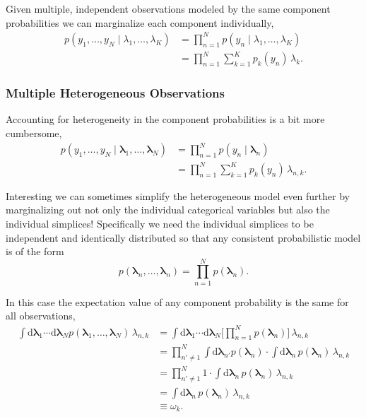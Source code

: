 \documentclass[
  letterpaper,
  DIV=11,
  numbers=noendperiod]{scrartcl}
\begin{document}
Given multiple, independent observations modeled by the same component
probabilities we can marginalize each component individually,
\begin{align*}
p(y_{1}, \ldots, y_{N} \mid \lambda_{1}, \ldots, \lambda_{K})
&=
\prod_{n = 1}^{N} p(y_{n} \mid \lambda_{1}, \ldots, \lambda_{K})
\\
&=
\prod_{n = 1}^{N} \sum_{k = 1}^{K} p_{k}(y_{n}) \, \lambda_{k}.
\end{align*}

\subsubsection{Multiple Heterogeneous
Observations}\label{multiple-heterogeneous-observations}

Accounting for heterogeneity in the component probabilities is a bit
more cumbersome, \begin{align*}
p(y_{1}, \ldots, y_{N} \mid
  \boldsymbol{\lambda}_{1}, \ldots, \boldsymbol{\lambda}_{N})
&=
\prod_{n = 1}^{N} p(y_{n} \mid \boldsymbol{\lambda}_{n})
\\
&=
\prod_{n = 1}^{N} \sum_{k = 1}^{K} p_{k}(y_{n}) \, \lambda_{n, k}.
\end{align*}

Interesting we can sometimes simplify the heterogeneous model even
further by marginalizing out not only the individual categorical
variables but also the individual simplices! Specifically we need the
individual simplices to be independent and identically distributed so
that any consistent probabilistic model is of the form \[
p(\boldsymbol{\lambda}_{n}, \ldots, \boldsymbol{\lambda}_{n})
=
\prod_{n = 1}^{N} p(\boldsymbol{\lambda}_{n}).
\]

In this case the expectation value of any component probability is the
same for all observations, \begin{align*}
\int \mathrm{d} \boldsymbol{\lambda}_{1} \cdots
     \mathrm{d} \boldsymbol{\lambda}_{N}
p(\boldsymbol{\lambda}_{1}, \ldots, \boldsymbol{\lambda}_{N}) \,
\lambda_{n, k}
&=
\int \mathrm{d} \boldsymbol{\lambda}_{1} \cdots
     \mathrm{d} \boldsymbol{\lambda}_{N}
\bigg[ \prod_{n = 1}^{N} p(\boldsymbol{\lambda}_{n}) \bigg] \,
\lambda_{n, k}
\\
&=
\prod_{n' \ne 1}^{N}
\int \mathrm{d} \boldsymbol{\lambda}_{n'}
p(\boldsymbol{\lambda}_{n})
\cdot
\int \mathrm{d} \boldsymbol{\lambda}_{n} \,
p(\boldsymbol{\lambda}_{n}) \, \lambda_{n, k}
\\
&=
\prod_{n' \ne 1}^{N} 1 \cdot
\int \mathrm{d} \boldsymbol{\lambda}_{n} \,
p(\boldsymbol{\lambda}_{n}) \, \lambda_{n, k}
\\
&=
\int \mathrm{d} \boldsymbol{\lambda}_{n} \,
p(\boldsymbol{\lambda}_{n}) \, \lambda_{n, k}
\\
&\equiv
\omega_{k}.
\end{align*}
\end{document}
